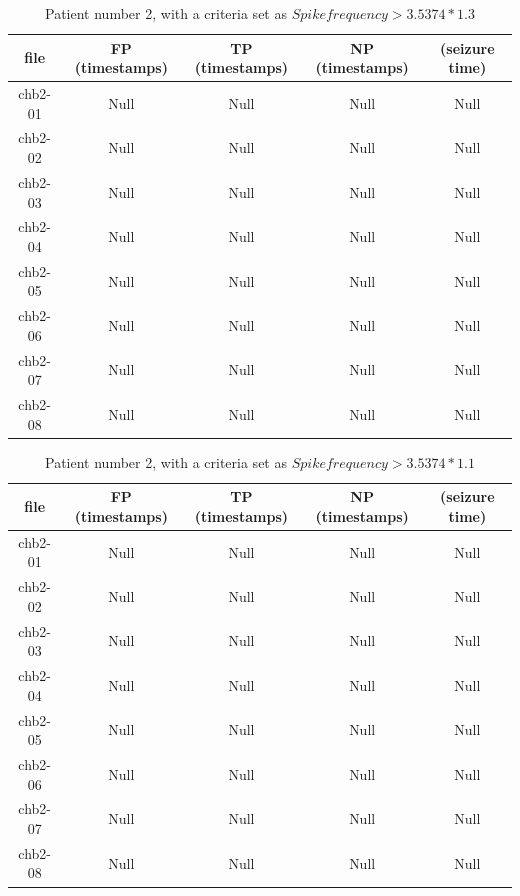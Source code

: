 \begin{table}[H]
\centering
    \begin{tabular}{c | c |c |c | c}
        \hline
         file &  FP (timestamps) & TP (timestamps) & NP (timestamps) & (seizure time)  \\
        \hline
        chb2-01 & Null & Null & Null & Null  \\
        chb2-02 & Null & Null & Null & Null \\
        chb2-03 & Null & Null & Null & Null  \\
        chb2-04	& Null & Null & Null & Null\\
        chb2-05 & Null & Null & Null & Null\\
        chb2-06 & Null & Null & Null & Null\\
        chb2-07 &  Null & Null & Null & Null  \\
        chb2-08 &  Null & Null & Null & Null  \\
        \hline
     \end{tabular} 
\caption{Patient number 2, with a criteria set as $Spike frequency > 3.5374*1.3$ }
\label{Freq3}
\end{table}

\begin{table}[H]
\centering
    \begin{tabular}{c | c |c |c | c}
        \hline
         file &  FP (timestamps) & TP (timestamps) & NP (timestamps) & (seizure time)  \\
        \hline
        chb2-01 & Null & Null & Null & Null  \\
        chb2-02 & Null & Null & Null & Null \\
        chb2-03 & Null & Null & Null & Null  \\
        chb2-04	& Null & Null & Null & Null\\
        chb2-05 & Null & Null & Null & Null\\
        chb2-06 & Null & Null & Null & Null\\
        chb2-07 &  Null & Null & Null & Null  \\
        chb2-08 &  Null & Null & Null & Null  \\
        \hline
     \end{tabular} 
\caption{Patient number 2, with a criteria set as $Spike frequency > 3.5374*1.1$ }
\label{Freq4}
\end{table}

